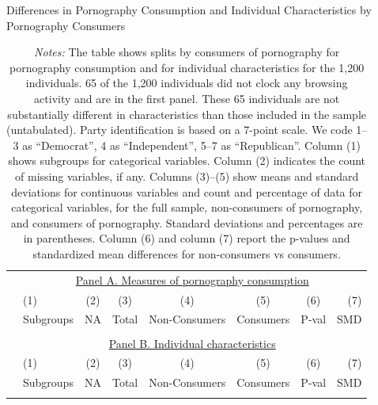 \documentclass[12pt,twoside]{article}
\begin{document}
\begin{table}[ht] \centering \scriptsize \setlength\tabcolsep{6 pt}
	\caption{Differences in Pornography Consumption and Individual Characteristics by Pornography Consumers}
	\label{tab:characteristics_split_by_porn_consumers}
	\begin{adjustbox}{max width=\textwidth}
		\begin{tabular}{@{\hspace{0\tabcolsep}}llrcccrr@{\hspace{0\tabcolsep}}}
			\toprule
			&\multicolumn{7}{c}{\underline{Panel A. Measures of pornography consumption}}\\
			&\multicolumn{1}{l}{(1)}&\multicolumn{1}{c}{(2)}&\multicolumn{1}{c}{(3)}&\multicolumn{1}{c}{(4)}&\multicolumn{1}{c}{(5)}&\multicolumn{1}{c}{(6)}&\multicolumn{1}{r}{(7)}\\			
			&\multicolumn{1}{l}{Subgroups}&\multicolumn{1}{c}{NA}&\multicolumn{1}{c}{Total}&\multicolumn{1}{c}{Non-Consumers}&\multicolumn{1}{c}{Consumers}&\multicolumn{1}{c}{P-val}&\multicolumn{1}{r}{SMD}\\
			\cmidrule{2-8}
			\\
			\cmidrule{2-8}
			&\multicolumn{7}{c}{\underline{Panel B. Individual characteristics}}\\
			&\multicolumn{1}{l}{(1)}&\multicolumn{1}{c}{(2)}&\multicolumn{1}{c}{(3)}&\multicolumn{1}{c}{(4)}&\multicolumn{1}{c}{(5)}&\multicolumn{1}{c}{(6)}&\multicolumn{1}{r}{(7)}\\			
			&\multicolumn{1}{l}{Subgroups}&\multicolumn{1}{c}{NA}&\multicolumn{1}{c}{Total}&\multicolumn{1}{c}{Non-Consumers}&\multicolumn{1}{c}{Consumers}&\multicolumn{1}{c}{P-val}&\multicolumn{1}{r}{SMD}\\
			\cmidrule{2-8}
			\\
			\bottomrule
		\end{tabular}
	\end{adjustbox}
	\caption*{\scriptsize \emph{Notes:}
		The table shows splits by consumers of pornography for pornography consumption and for individual characteristics for the 1,200 individuals.
		65 of the 1,200 individuals did not clock any browsing activity and are in the first panel.
		These 65 individuals are not substantially different in characteristics than those included in the sample (untabulated).
		Party identification is based on a 7-point scale. We code 1--3 as ``Democrat'', 4 as ``Independent'', 5--7 as ``Republican''.
		Column (1) shows subgroups for categorical variables.
		Column (2) indicates the count of missing variables, if any.
		Columns (3)--(5) show means and standard deviations for continuous variables and count and percentage of data for categorical variables, for the full sample, non-consumers of pornography, and consumers of pornography.
		Standard deviations and percentages are in parentheses.
		Column (6) and column (7) report the p-values and standardized mean differences for non-consumers vs consumers.
	}
\end{table}
\end{document}
